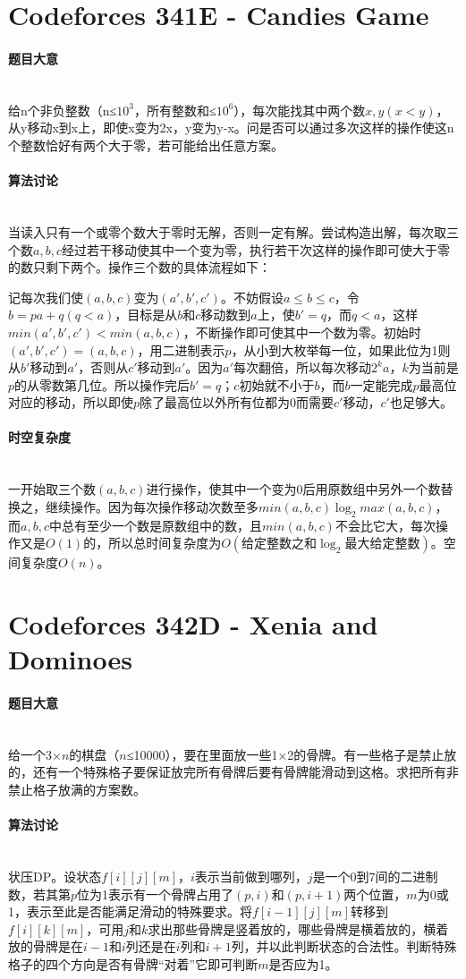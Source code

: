 \documentclass[UTF8]{ctexart}
\newcommand{\myparagraph}[1]{\paragraph{#1}\mbox{}\\}
\theoremstyle{nonumberplain}
\begin{document}
	\section{Codeforces 341E - Candies Game}
		
		\myparagraph{题目大意}
			
			给n个非负整数（n≤$10^3$，所有整数和≤$10^6$），每次能找其中两个数$x,y(x<y)$，从y移动x到x上，即使x变为2x，y变为y-x。问是否可以通过多次这样的操作使这n个整数恰好有两个大于零，若可能给出任意方案。
			
		\myparagraph{算法讨论}
		
			当读入只有一个或零个数大于零时无解，否则一定有解。尝试构造出解，每次取三个数$a,b,c$经过若干移动使其中一个变为零，执行若干次这样的操作即可使大于零的数只剩下两个。操作三个数的具体流程如下：
			
			记每次我们使$(a,b,c)$变为$(a',b',c')$。不妨假设$a \leq b \leq c$，令$b=pa+q(q<a)$，目标是从$b$和$c$移动数到$a$上，使$b'=q$，而$q<a$，这样$min(a',b',c')<min(a,b,c)$，不断操作即可使其中一个数为零。初始时$(a',b',c')=(a,b,c)$，用二进制表示$p$，从小到大枚举每一位，如果此位为1则从$b'$移动到$a'$，否则从$c'$移动到$a'$。因为$a'$每次翻倍，所以每次移动$2^k a$，$k$为当前是$p$的从零数第几位。所以操作完后$b'=q$；$c$初始就不小于$b$，而$b$一定能完成$p$最高位对应的移动，所以即使$p$除了最高位以外所有位都为0而需要$c'$移动，$c'$也足够大。
		
		\myparagraph{时空复杂度}
		
			一开始取三个数$(a,b,c)$进行操作，使其中一个变为0后用原数组中另外一个数替换之，继续操作。因为每次操作移动次数至多$min(a,b,c)\log_2max(a,b,c)$，而$a,b,c$中总有至少一个数是原数组中的数，且$min(a,b,c)$不会比它大，每次操作又是$O(1)$的，所以总时间复杂度为$O(\mbox{给定整数之和}\log_2\mbox{最大给定整数})$。空间复杂度$O(n)$。
	
	\section{Codeforces 342D - Xenia and Dominoes}
	
		\myparagraph{题目大意}
		
			给一个3×$n$的棋盘（$n$≤10000），要在里面放一些1×2的骨牌。有一些格子是禁止放的，还有一个特殊格子要保证放完所有骨牌后要有骨牌能滑动到这格。求把所有非禁止格子放满的方案数。
		
		\myparagraph{算法讨论}
		
			状压DP。设状态$f[i][j][m]$，$i$表示当前做到哪列，$j$是一个0到7间的二进制数，若其第$p$位为1表示有一个骨牌占用了$(p,i)$和$(p,i+1)$两个位置，$m$为0或1，表示至此是否能满足滑动的特殊要求。将$f[i-1][j][m]$转移到$f[i][k][m]$，可用$j$和$k$求出那些骨牌是竖着放的，哪些骨牌是横着放的，横着放的骨牌是在$i-1$和$i$列还是在$i$列和$i+1$列，并以此判断状态的合法性。判断特殊格子的四个方向是否有骨牌“对着”它即可判断$m$是否应为1。
			
\end{document}
